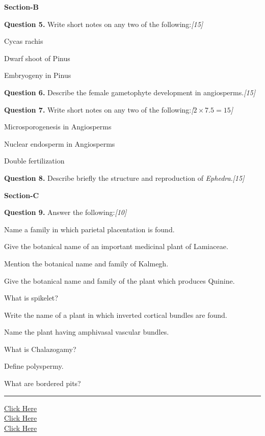 \documentclass[11pt,a4paper]{article}
\newcommand{\pts}[1]{\hfill   \textit{[#1]}}
\begin{document}
\bigskip

\begin{center}
   \textbf{Section-B}
\end{center}
\medskip

\medskip


\noindent   \textbf{Question 5.} Write short notes on any two of the following:\pts{15}

\begin{parts}
  \item Cycas rachis
  \item Dwarf shoot of Pinus
  \item Embryogeny in Pinus
\end{parts}

\medskip


\noindent   \textbf{Question 6.} Describe the female gametophyte development in angiosperms.\pts{15}

\medskip


\noindent   \textbf{Question 7.} Write short notes on any two of the following:\pts{$2  \times 7.5 = 15$}

\begin{parts}
  \item Microsporogenesis in Angiosperms
  \item Nuclear endosperm in Angiosperms
  \item Double fertilization
\end{parts}

\medskip


\noindent   \textbf{Question 8.} Describe briefly the structure and reproduction of   \textit{Ephedra}.\pts{15}

\bigskip

\begin{center}
   \textbf{Section-C}
\end{center}
\medskip

\medskip


\noindent   \textbf{Question 9.} Answer the following:\pts{10}

\begin{parts}
  \item Name a family in which parietal placentation is found.
  \item Give the botanical name of an important medicinal plant of Lamiaceae.
  \item Mention the botanical name and family of Kalmegh.
  \item Give the botanical name and family of the plant which produces Quinine.
  \item What is spikelet?
  \item Write the name of a plant in which inverted cortical bundles are found.
  \item Name the plant having amphivasal vascular bundles.
  \item What is Chalazogamy?
  \item Define polyspermy.
  \item What are bordered pits?
\end{parts}

\vfill
\rule{\linewidth}{0.4pt}

\begin{center}\small
\href{https://bhu-exam.vercel.app/}{Click Here}\\[4pt]\href{https://me-aryan.vercel.app/}{Click Here}\\[4pt]\href{https://quashan-me.vercel.app/}{Click Here}
\end{center}
\end{document}
